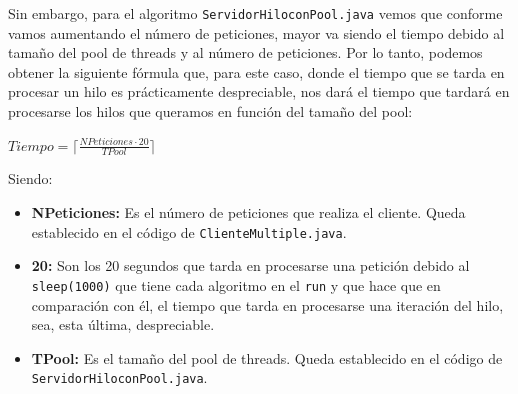\documentclass[12pt,letterpaper]{article}
\begin{document}
Sin embargo, para el algoritmo \texttt{ServidorHiloconPool.java} vemos que conforme vamos aumentando el número de peticiones, mayor va siendo el tiempo debido al tamaño del pool de threads y al número de peticiones. Por lo tanto, podemos obtener la siguiente fórmula que, para este caso, donde el tiempo que se tarda en procesar un hilo es prácticamente despreciable, nos dará el tiempo que tardará en procesarse los hilos que queramos en función del tamaño del pool:\\
\begin{center}
	$Tiempo = \lceil{\frac{NPeticiones\cdot 20}{TPool}}\rceil$
\end{center}
\newpage
Siendo:
\begin{itemize}
	\item \textbf{NPeticiones:} Es el número de peticiones que realiza el cliente. Queda establecido en el código de \texttt{ClienteMultiple.java}.
	\item \textbf{20:} Son los 20 segundos que tarda en procesarse una petición debido al \texttt{sleep(1000)} que tiene cada algoritmo en el \texttt{run} y que hace que en comparación con él, el tiempo que tarda en procesarse una iteración del hilo, sea, esta última, despreciable.
	\item \textbf{TPool:} Es el tamaño del pool de threads. Queda establecido en el código de \texttt{ServidorHiloconPool.java}.
\end{itemize}
\end{document}
